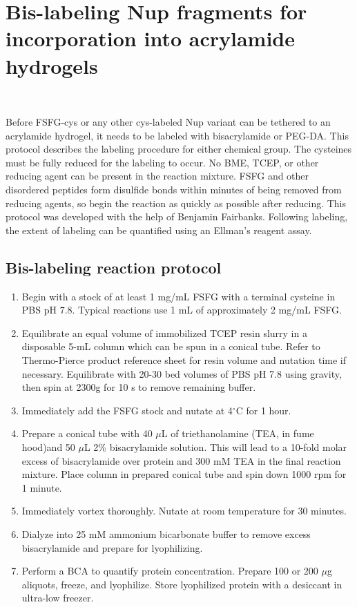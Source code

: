 \chapter{Bis-labeling Nup fragments for incorporation into acrylamide hydrogels}~\label{appx:bis-labeling}

Before FSFG-cys or any other cys-labeled Nup variant can be tethered to an acrylamide hydrogel, it needs to be labeled with bisacrylamide or PEG-DA.  This protocol describes the labeling procedure for either chemical group.  The cysteines must be fully reduced for the labeling to occur.  No BME, TCEP, or other reducing agent can be present in the reaction mixture.  FSFG and other disordered peptides form disulfide bonds within minutes of being removed from reducing agents, so begin the reaction as quickly as possible after reducing.  This protocol was developed with the help of Benjamin Fairbanks.  Following labeling, the extent of labeling can be quantified using an Ellman's reagent assay.

\section{Bis-labeling reaction protocol}

\begin{enumerate}
\item Begin with a stock of at least 1 mg/mL FSFG with a terminal cysteine in PBS pH 7.8.  Typical reactions use 1 mL of approximately 2 mg/mL FSFG.
\item Equilibrate an equal volume of immobilized TCEP resin slurry in a disposable 5-mL column which can be spun in a conical tube.  Refer to Thermo-Pierce product reference sheet for resin volume and nutation time if necessary.  Equilibrate with 20-30 bed volumes of PBS pH 7.8 using gravity, then spin at 2300g for 10 s to remove remaining buffer.
\item Immediately add the FSFG stock and nutate at 4$^\circ$C for 1 hour.
\item Prepare a conical tube with 40 $\mu$L of triethanolamine (TEA, in fume hood)and 50 $\mu$L 2\% bisacrylamide solution.  This will lead to a 10-fold molar excess of bisacrylamide over protein and 300 mM TEA in the final reaction mixture. Place column in prepared conical tube and spin down 1000 rpm for 1 minute.
\item Immediately vortex thoroughly.  Nutate at room temperature for 30 minutes.
\item Dialyze into 25 mM ammonium bicarbonate buffer to remove excess bisacrylamide and prepare for lyophilizing.
\item Perform a BCA to quantify protein concentration. Prepare 100 or 200 $\mu$g aliquots, freeze, and lyophilize.  Store lyophilized protein with a desiccant in ultra-low freezer.
\end{enumerate}

